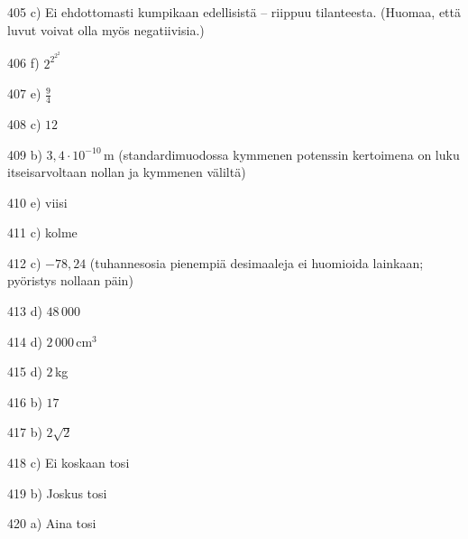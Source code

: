 \begin{Vastaus}{405}
	 c) Ei ehdottomasti kumpikaan edellisistä -- riippuu tilanteesta. (Huomaa, että luvut voivat olla myös negatiivisia.)
    
\end{Vastaus}
\begin{Vastaus}{406}
	 f) $2^{2^{2^2}}$
	
\end{Vastaus}
\begin{Vastaus}{407}
e) $\frac{9}{4}$
\end{Vastaus}
\begin{Vastaus}{408}
c) $12$
\end{Vastaus}
\begin{Vastaus}{409}
b) $3,4 \cdot 10^{-10}$\,m (standardimuodossa kymmenen potenssin kertoimena on luku itseisarvoltaan nollan ja kymmenen väliltä)
\end{Vastaus}
\begin{Vastaus}{410}
e) viisi
\end{Vastaus}
\begin{Vastaus}{411}
c) kolme
\end{Vastaus}
\begin{Vastaus}{412}
c) $-78,24$ (tuhannesosia pienempiä desimaaleja ei huomioida lainkaan; pyöristys nollaan päin)
\end{Vastaus}
\begin{Vastaus}{413}
d) $48\,000$
\end{Vastaus}
\begin{Vastaus}{414}
	d) $2\,000$\,cm$^3$
	
\end{Vastaus}
\begin{Vastaus}{415}
	d) $2$\,kg
	
\end{Vastaus}
\begin{Vastaus}{416}
	b) $17$
	
\end{Vastaus}
\begin{Vastaus}{417}
	 b) $2\sqrt{2}$
    
\end{Vastaus}
\begin{Vastaus}{418}
c) Ei koskaan tosi
\end{Vastaus}
\begin{Vastaus}{419}
b) Joskus tosi
\end{Vastaus}
\begin{Vastaus}{420}
a) Aina tosi
\end{Vastaus}
